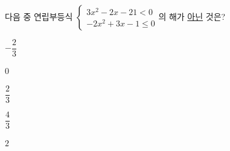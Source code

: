 다음 중 연립부등식 $\begin{cases} 3x^2-2x-21<0 \\ -2x^2+3x-1\le 0 \end{cases}$의 해가 \underline{아닌} 것은?
\begin{choices32}{\rule[-3ex]{0pt}{8ex}$-\dfrac{2}{3}$}{\rule[-3ex]{0pt}{8ex}$0$}{\rule[-3ex]{0pt}{8ex}$\dfrac{2}{3}$}{\rule[-3ex]{0pt}{8ex}$\dfrac{4}{3}$}{\rule[-3ex]{0pt}{8ex}$2$}\end{choices32}
